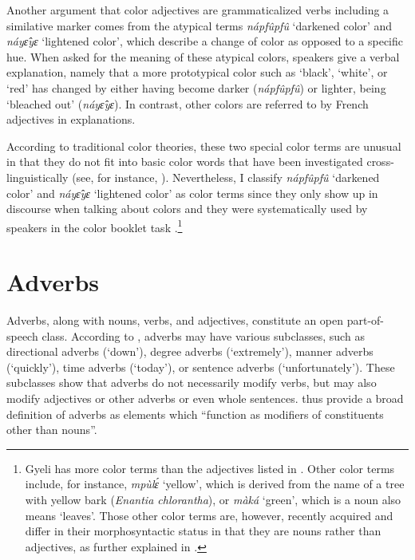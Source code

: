 Another argument that color adjectives are grammaticalized verbs including a similative marker comes from the atypical terms {\itshape nápfûpfû} `darkened color' and {\itshape náyɛ̂yɛ} `lightened color', which describe a change of color as opposed to a specific hue. When asked for the meaning of these atypical colors, speakers give a verbal explanation, namely that a more prototypical color such as `black', `white', or `red' has changed by either having become darker ({\itshape nápfûpfû}) or lighter, being `bleached out' ({\itshape náyɛ̂yɛ}). In contrast, other colors are referred to by French adjectives in explanations.

According to traditional color theories, these two special color terms are unusual in that they do not fit into basic color words that have been investigated cross-linguistically (see, for instance, \citealt{berlin69}). 
Nevertheless, I classify {\itshape nápfûpfû} `darkened color' and {\itshape náyɛ̂yɛ} `lightened color' as color terms since they only show up in discourse when talking about colors and they were systematically used by speakers in the color booklet task \citep{majid2007a}.\footnote{Gyeli has more color terms than the adjectives listed in . Other color terms include, for instance, {\itshape mpùlɛ́} `yellow', which is derived from the name of a tree with yellow bark ({\itshape Enantia chlorantha}), or {\itshape màká} `green', which is a noun also means `leaves'. Those other color terms are, however, recently acquired and differ in their morphosyntactic status in that they are nouns rather than adjectives, as further explained in \citet{grimm2014}.}







\section{Adverbs}
\label{sec:ADV}







Adverbs, along with nouns, verbs, and adjectives, constitute an open part-of-speech class. According to \citet[20]{schachter2007}, adverbs may have various subclasses, such as directional adverbs (`down'), degree adverbs (`extremely'), manner adverbs (`quickly'), time adverbs (`today'), or sentence adverbs (`unfortunately'). These subclasses show that adverbs do not necessarily modify verbs, but may also modify adjectives or other adverbs or even whole sentences. \citet[20]{schachter2007} thus provide a broad definition of adverbs as elements which ``function as modifiers of constituents other than nouns''. 

